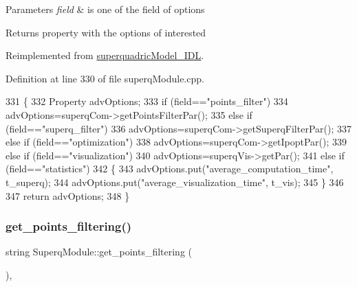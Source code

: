 \begin{DoxyParams}{Parameters}
{\em field} & is one of the field of options \\
\hline
\end{DoxyParams}
\begin{DoxyReturn}{Returns}
property with the options of interested 
\end{DoxyReturn}


Reimplemented from \mbox{\hyperlink{classsuperquadricModel__IDL_a50b388a29852f9d8b57a0bbb276d4675}{superquadric\+Model\+\_\+\+I\+DL}}.



Definition at line 330 of file superq\+Module.\+cpp.


\begin{DoxyCode}
331 \{
332     Property advOptions;
333     \textcolor{keywordflow}{if} (field==\textcolor{stringliteral}{"points\_filter"})
334         advOptions=superqCom->getPointsFilterPar();
335     \textcolor{keywordflow}{else} \textcolor{keywordflow}{if} (field==\textcolor{stringliteral}{"superq\_filter"})
336         advOptions=superqCom->getSuperqFilterPar();
337     \textcolor{keywordflow}{else} \textcolor{keywordflow}{if} (field==\textcolor{stringliteral}{"optimization"})
338         advOptions=superqCom->getIpoptPar();
339     \textcolor{keywordflow}{else} \textcolor{keywordflow}{if} (field==\textcolor{stringliteral}{"visualization"})
340         advOptions=superqVis->getPar();
341     \textcolor{keywordflow}{else} \textcolor{keywordflow}{if} (field==\textcolor{stringliteral}{"statistics"})
342     \{
343         advOptions.put(\textcolor{stringliteral}{"average\_computation\_time"}, t_superq);
344         advOptions.put(\textcolor{stringliteral}{"average\_visualization\_time"}, t_vis);
345     \}       
346 
347     \textcolor{keywordflow}{return} advOptions;
348 \}
\end{DoxyCode}
\mbox{\label{classSuperqModule_a60c8ff17436cc55a3e9b704dd6c2529b}} 
\subsubsection{\texorpdfstring{get\+\_\+points\+\_\+filtering()}{get\_points\_filtering()}}
{\footnotesize\ttfamily string Superq\+Module\+::get\+\_\+points\+\_\+filtering (\begin{DoxyParamCaption}{ }\end{DoxyParamCaption})\hspace{0.3cm}{\ttfamily [protected]}, {\ttfamily [virtual]}}




